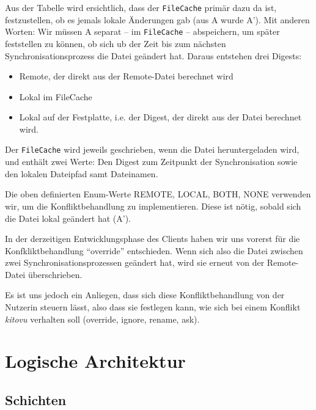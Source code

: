 \documentclass[a4paper]{article}
\let\oldsection\section
\renewcommand\section{\clearpage\oldsection}
\begin{document}
Aus der Tabelle wird ersichtlich, dass der \verb|FileCache| primär dazu da ist, festzustellen, ob es jemals lokale Änderungen gab (aus A wurde A'). Mit anderen Worten: Wir müssen A separat -- im \verb|FileCache| -- abspeichern, um später feststellen zu können, ob sich ub der Zeit bis zum nächsten Synchronisationsprozess die Datei geändert hat. Daraus entstehen drei Digests:

\begin{itemize}
	\item Remote, der direkt aus der Remote-Datei berechnet wird
	\item Lokal im FileCache
	\item Lokal auf der Festplatte, i.e. der Digest, der direkt aus der Datei berechnet wird.
\end{itemize}

Der \verb|FileCache| wird jeweils geschrieben, wenn die Datei heruntergeladen wird, und enthält zwei Werte: Den Digest zum Zeitpunkt der Synchronisation sowie den lokalen Dateipfad samt Dateinamen.

Die oben definierten Enum-Werte REMOTE, LOCAL, BOTH, NONE verwenden wir, um die Konfliktbehandlung zu implementieren. Diese ist nötig, sobald sich die Datei lokal geändert hat (A').

In der derzeitigen Entwicklungsphase des Clients haben wir uns vorerst für die Konfkliktbehandlung ``override'' entschieden. Wenn sich also die Datei zwischen zwei Synchronisationsprozessen geändert hat, wird sie erneut von der Remote-Datei überschrieben.

Es ist uns jedoch ein Anliegen, dass sich diese Konfliktbehandlung von der Nutzerin steuern lässt, also dass sie festlegen kann, wie sich bei einem Konflikt \emph{kitovu} verhalten soll (override, ignore, rename, ask).

\section{Logische Architektur}



\subsection{Schichten}
\end{document}
